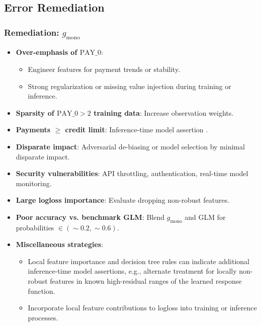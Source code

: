 \documentclass[11pt,
               aspectratio=169,
               hyperref={colorlinks}
               ]{beamer}
\begin{document}
		\subsection{Error Remediation}

			\begin{frame}
		
				\frametitle{\textbf{Remediation}: $g_{\text{mono}}$}
				
				\begin{itemize}\scriptsize
					\item \textbf{Over-emphasis of $\text{PAY\_0}$}:
					\begin{itemize}\scriptsize
						\item Engineer features for payment trends or stability.
						\item Strong regularization or missing value injection during training or inference.
					\end{itemize}
					\item \textbf{Sparsity of $\text{PAY\_0} > 2$ training data}: Increase observation weights. 
					\item \textbf{Payments $\geq$ credit limit}: Inference-time model assertion \cite{kangdebugging}. 
					\item \textbf{Disparate impact}: Adversarial de-biasing \cite{zhang2018mitigating} or model selection by minimal disparate impact. 
					\item \textbf{Security vulnerabilities}: API throttling, authentication, real-time model monitoring. 
					\item \textbf{Large logloss importance}: Evaluate dropping non-robust features.
					\item \textbf{Poor accuracy vs. benchmark GLM}: Blend $g_{\text{mono}}$ and GLM for probabilities $\in (\sim0.2, \sim0.6)$.
					\item \textbf{Miscellaneous strategies}: 
					\begin{itemize}\scriptsize
						\item Local feature importance and decision tree rules can indicate additional inference-time model assertions, e.g., alternate treatment for locally non-robust features in known high-residual ranges of the learned response function. 
						\item Incorporate local feature contributions to logloss into training or inference processes.
					\end{itemize}
				\end{itemize}
				\normalsize

			\end{frame}		
			
\end{document}
